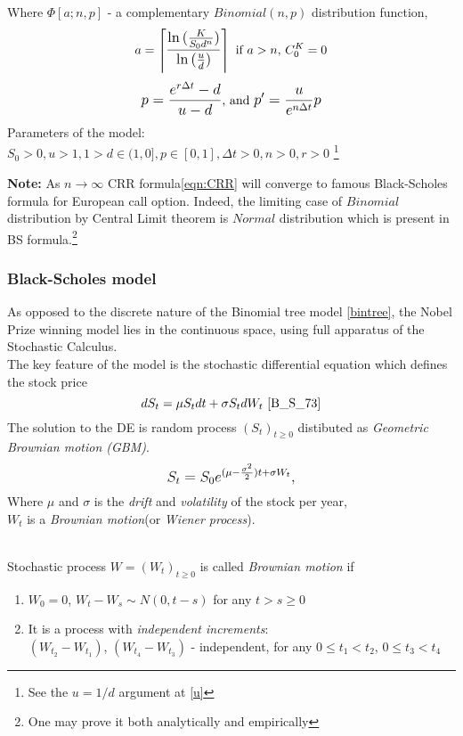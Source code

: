 \documentclass[11pt]{article}
\begin{document}
Where $\Phi[a;n,p]$ - a complementary $Binomial(n,p)$  distribution function,\\
\[a = \left\lceil \mathlarger{\frac{\ln{(\frac{K}{S_0d^n})}}{\ln{(\frac{u}{d})}}} \right\rceil \text{ if $a > n$, $C_0^K = 0$}\]
\[\mathlarger{p = \frac{e^{r\Delta{t}} - d}{u - d}}\text{, and } \mathlarger{p' = \frac{u}{e^{n\Delta{t}}}p}\]
Parameters of the model: $S_0 > 0, u > 1, 1 > d \in{(1,0]}, p \in{[0,1]}, \Delta{t} > 0, n > 0, r > 0$ \footnote{See the $u=1/d$ argument at \ref{u}}

\textbf{Note:}
As $n\to\infty$ CRR formula\ref{eqn:CRR} will converge to famous Black-Scholes formula for European call option.\cite{C_R_R_79} Indeed, the limiting case of $Binomial$ distribution by Central Limit theorem is $Normal$ distribution which is present in BS formula.\footnote{One may prove it both analytically and empirically} 
\newpage
\subsubsection{Black-Scholes model}
As opposed to the discrete nature of the Binomial tree model \ref{bintree}, the Nobel Prize winning model lies in the continuous space, using full apparatus of the Stochastic Calculus.\\
The key feature of the model is the stochastic differential equation which defines the stock price
\[
dS_t = \mu{S_t}dt + \sigma{S_t}dW_t \text{ \cite{B_S_73}} 
\]
The solution to the DE is random process $(S_t)_{t\geqslant0}$ distibuted as \textit{Geometric Brownian motion (GBM)}.\cite{S_73}
\[\mathlarger{S_t = S_0e^{(\mu-\frac{\sigma^2}{2})t+\sigma{W_t}},}\]
Where $\mu$ and $\sigma$ is the \textit{drift} and \textit{volatility}  of the stock per year,\\ 
$W_t$ is a \textit{Brownian motion}(or \textit{Wiener process}).

\begin{definition} \cite{ICEF_A} \\
\label{brownian}
Stochastic process $W = (W_t)_{t\geqslant0}$ is called \textit{Brownian motion} if
\begin{enumerate}
    \item $W_0 = 0$, $W_t - W_s \sim N(0, t-s)$ for any $t>s\geqslant0$
    \item {It is a process with \textit{independent increments}:\\ 
    $(W_{t_2} - W_{t_1})$, $(W_{t_4} - W_{t_3})$ - independent, for any $0 \leqslant t_1 < t_2$, $0 \leqslant t_3 < t_4$}
\end{enumerate}
\end{definition}
\end{document}
